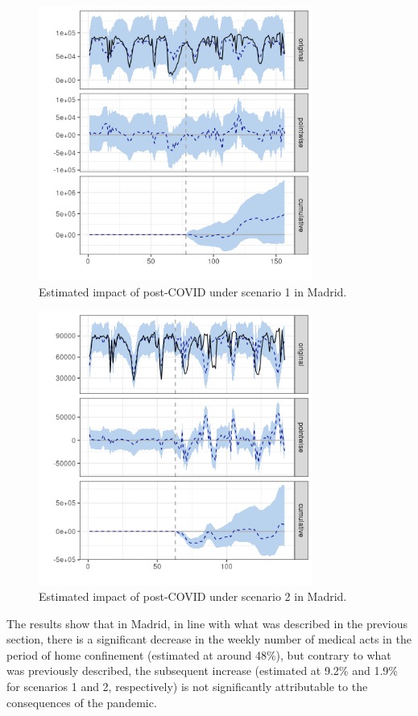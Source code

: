 \documentclass[9pt]{osa-supplemental-document}
\begin{document}
\begin{center}
\begin{figure}[H]
  \includegraphics[width=9cm]{global_post_scen1_Madrid.png}\caption{Estimated impact of post-COVID under scenario 1 in Madrid.}
\end{figure}
\end{center}

\begin{center}
    \begin{figure}[H]
      \includegraphics[width=9cm]{global_post_scen2_Madrid.png}\caption{Estimated impact of post-COVID under scenario 2 in Madrid.}
    \end{figure}
    \end{center}
    
The results show that in Madrid, in line with what was described in the previous section, there is a significant decrease in the weekly number of medical acts in the period of home confinement (estimated at around 48\%), but contrary to what was previously described, the subsequent increase (estimated at 9.2\% and 1.9\% for scenarios 1 and 2, respectively) is not significantly attributable to the consequences of the pandemic.
\end{document}
